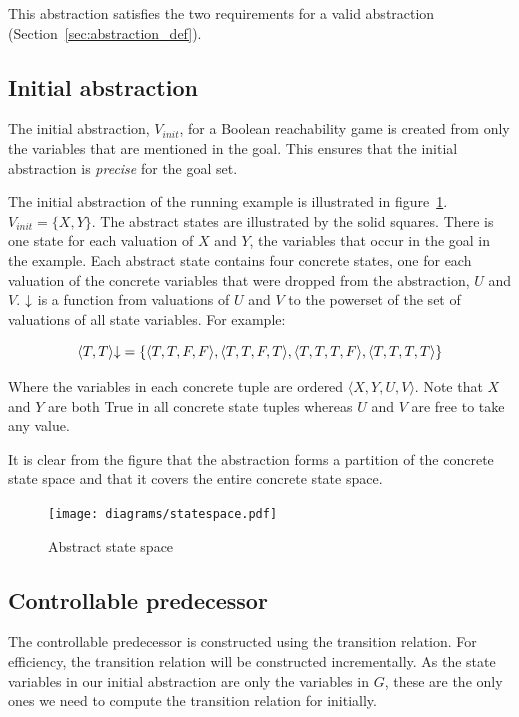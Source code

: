 This abstraction satisfies the two requirements for a valid abstraction (Section~\ref{sec:abstraction_def}). 

\subsection{Initial abstraction}

The initial abstraction, $V_{init}$, for a Boolean reachability game is created from only the variables that are mentioned in the goal. This ensures that the initial abstraction is \emph{precise} for the goal set.

The initial abstraction of the running example is illustrated in figure~\ref{fig:abs_state_sp}. $V_{init} = \{X, Y\}$. The abstract states are illustrated by the solid squares. There is one state for each valuation of $X$ and $Y$, the variables that occur in the goal in the example. Each abstract state contains four concrete states, one for each valuation of the concrete variables that were dropped from the abstraction, $U$ and $V$. $\mathord{\downarrow}$ is a function from valuations of $U$ and $V$ to the powerset of the set of valuations of all state variables. For example:

\begin{equation}
    \langle T, T \rangle\mathord{\downarrow} = \{ \langle T, T, F, F \rangle, \langle T, T, F, T \rangle, \langle T, T, T, F \rangle, \langle T, T, T, T \rangle \}
\end{equation}

Where the variables in each concrete tuple are ordered $\langle X, Y, U, V \rangle$. Note that $X$ and $Y$ are both True in all concrete state tuples whereas $U$ and $V$ are free to take any value.

It is clear from the figure that the abstraction forms a partition of the concrete state space and that it covers the entire concrete state space.

\begin{figure}[t]
\centering
\texttt{[image: diagrams/statespace.pdf]}
\caption{Abstract state space}
\label{fig:abs_state_sp}
\end{figure}

\subsection{Controllable predecessor}
\label{sec:var_cpre}

The controllable predecessor is constructed using the transition relation. For efficiency, the transition relation will be constructed incrementally. As the state variables in our initial abstraction are only the variables in $G$, these are the only ones we need to compute the transition relation for initially.

